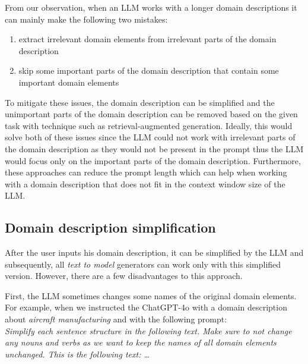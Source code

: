 From our observation, when an LLM works with a longer domain descriptions it can mainly make the following two mistakes:

\begin{enumerate}
\item extract irrelevant domain elements from irrelevant parts of the domain description
\item skip some important parts of the domain description that contain some important domain elements
\end{enumerate}


\noindent{}To mitigate these issues, the domain description can be simplified and the unimportant parts of the domain description can be removed based on the given task with technique such as retrieval-augmented generation. Ideally, this would solve both of these issues since the LLM could not work with irrelevant parts of the domain description as they would not be present in the prompt thus the LLM would focus only on the important parts of the domain description.
Furthermore, these approaches can reduce the prompt length which can help when working with a domain description that does not fit in the context window size of the LLM.



\subsection{Domain description simplification}

After the user inputs his domain description, it can be simplified by the LLM and subsequently, all \emph{text to model} generators can work only with this simplified version. However, there are a few disadvantages to this approach.

First, the LLM sometimes changes some names of the original domain elements. For example, when we instructed the ChatGPT-4o with a domain description about \emph{aircraft manufacturing} and with the following prompt: \\

\noindent{}\textit{Simplify each sentence structure in the following text. Make sure to not change any nouns and verbs as we want to keep the names of all domain elements unchanged. This is the following text: \ldots} \\


